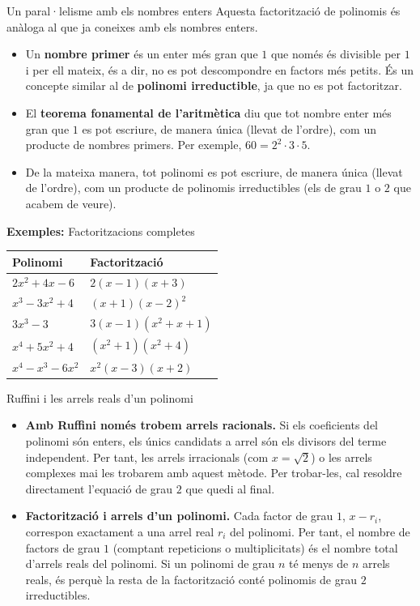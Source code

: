 \begin{nota}{Un paral·lelisme amb els nombres enters}
Aquesta factorització de polinomis és anàloga al que ja coneixes amb els nombres enters.

\begin{itemize}
\item Un \textbf{nombre primer} és un enter més gran que $1$ que només és divisible per $1$ i per ell mateix, és a dir, no es pot descompondre en factors més petits. És un concepte similar al de \textbf{polinomi irreductible}, ja que no es pot factoritzar.
\item El \textbf{teorema fonamental de l'aritmètica} diu que tot nombre enter més gran que $1$ es pot escriure, de manera única (llevat de l'ordre), com un producte de nombres primers. Per exemple, $60 = 2^2\cdot 3\cdot 5$.
\item De la mateixa manera, tot polinomi es pot escriure, de manera única (llevat de l'ordre), com un producte de polinomis irreductibles (els de grau $1$ o $2$ que acabem de veure).
\end{itemize}
\end{nota}

\begin{exemple}{\textbf{Exemples:} Factoritzacions completes}
\begin{center}
\begin{tabular}{ll}
\toprule
\textbf{Polinomi} & \textbf{Factorització} \\
\midrule
$2x^2+4x-6$ & $2(x-1)(x+3)$ \\
$x^3-3x^2+4$ & $(x+1)(x-2)^2$ \\
$3x^3-3$ & $3(x-1)(x^2+x+1)$ \\
$x^4+5x^2+4$ & $(x^2+1)(x^2+4)$ \\
$x^4-x^3-6x^2$ & $x^2(x-3)(x+2)$ \\
\bottomrule
\end{tabular}
\end{center}
\end{exemple}

\begin{nota}{Ruffini i les arrels reals d'un polinomi}
\begin{itemize}
\item \textbf{Amb Ruffini només trobem arrels racionals.} Si els coeficients del polinomi són enters, els únics candidats a arrel són els divisors del terme independent. Per tant, les arrels irracionals (com $x=\sqrt{2}$) o les arrels complexes mai les trobarem amb aquest mètode. Per trobar-les, cal resoldre directament l'equació de grau $2$ que quedi al final.
\item \textbf{Factorització i arrels d'un polinomi.} Cada factor de grau $1$, $x-r_i$, correspon exactament a una arrel real $r_i$ del polinomi. Per tant, el nombre de factors de grau $1$ (comptant repeticions o multiplicitats) és el nombre total d'arrels reals del polinomi. Si un polinomi de grau $n$ té menys de $n$ arrels reals, és perquè la resta de la factorització conté polinomis de grau $2$ irreductibles.
\end{itemize}
\end{nota}

